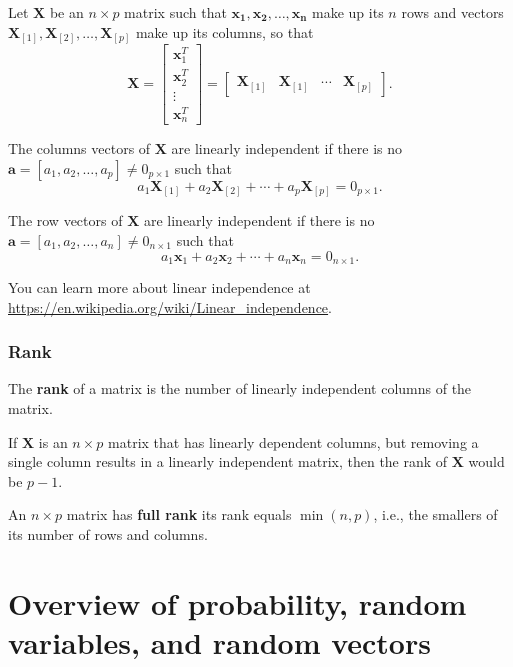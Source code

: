 \documentclass[
]{book}
\theoremstyle{definition}
\theoremstyle{definition}
\theoremstyle{definition}
\theoremstyle{definition}
\theoremstyle{remark}
\begin{document}
Let \(\mathbf{X}\) be an \(n\times p\) matrix such that \(\mathbf{x_1}, \mathbf{x_2}, \ldots, \mathbf{x_n}\) make up its \(n\) rows and vectors \(\mathbf{X}_{[1]}, \mathbf{X}_{[2]}, \ldots, \mathbf{X}_{[p]}\) make up its columns, so that
\[
\mathbf{X}=
\begin{bmatrix}
\mathbf{x}_1^T\\
\mathbf{x}_2^T\\
\vdots\\
\mathbf{x}_n^T
\end{bmatrix}=
\begin{bmatrix}
\mathbf{X}_{[1]} & \mathbf{X}_{[1]} & \cdots & \mathbf{X}_{[p]}
\end{bmatrix}.
\]

The columns vectors of \(\mathbf{X}\) are linearly independent if there is no \(\mathbf{a}=[a_1,a_2,\ldots,a_p]\neq 0_{p\times 1}\) such that
\[
a_1 \mathbf{X}_{[1]} + a_2 \mathbf{X}_{[2]} + \cdots + a_p \mathbf{X}_{[p]} = 0_{p\times 1}.
\]

The row vectors of \(\mathbf{X}\) are linearly independent if there is no \(\mathbf{a}=[a_1,a_2,\ldots,a_n]\neq 0_{n\times 1}\) such that
\[
a_1 \mathbf{x}_{1} + a_2 \mathbf{x}_{2} + \cdots + a_n \mathbf{x}_{n} = 0_{n\times 1}.
\]

You can learn more about linear independence at \href{\%5Bhttps://en.wikipedia.org/wiki/Linear_independence\%5D}{https://en.wikipedia.org/wiki/Linear\_independence}.

\hypertarget{rank}{%
\subsection{Rank}\label{rank}}

The \textbf{rank} of a matrix is the number of linearly independent columns of the matrix.

If \(\mathbf{X}\) is an \(n\times p\) matrix that has linearly dependent columns, but removing a single column results in a linearly independent matrix, then the rank of \(\mathbf{X}\) would be \(p-1\).

An \(n\times p\) matrix has \textbf{full rank} its rank equals \(\min(n, p)\), i.e., the smallers of its number of rows and columns.

\hypertarget{prob-review}{%
\chapter{Overview of probability, random variables, and random vectors}\label{prob-review}}
\end{document}
